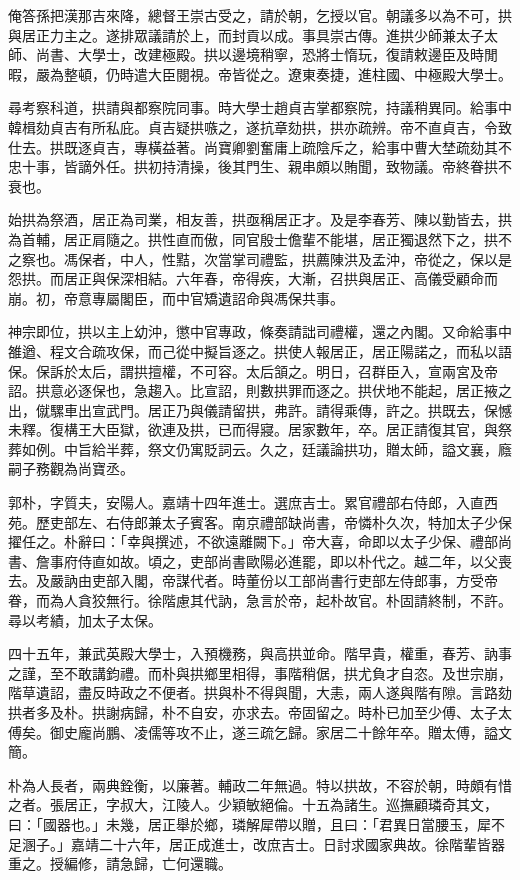 \begin{pinyinscope}
俺答孫把漢那吉來降，總督王崇古受之，請於朝，乞授以官。朝議多以為不可，拱與居正力主之。遂排眾議請於上，而封貢以成。事具崇古傳。進拱少師兼太子太師、尚書、大學士，改建極殿。拱以邊境稍寧，恐將士惰玩，復請敕邊臣及時閒暇，嚴為整頓，仍時遣大臣閱視。帝皆從之。遼東奏捷，進柱國、中極殿大學士。

尋考察科道，拱請與都察院同事。時大學士趙貞吉掌都察院，持議稍異同。給事中韓楫劾貞吉有所私庇。貞吉疑拱嗾之，遂抗章劾拱，拱亦疏辨。帝不直貞吉，令致仕去。拱既逐貞吉，專橫益著。尚寶卿劉奮庸上疏陰斥之，給事中曹大埜疏劾其不忠十事，皆謫外任。拱初持清操，後其門生、親串頗以賄聞，致物議。帝終眷拱不衰也。

始拱為祭酒，居正為司業，相友善，拱亟稱居正才。及是李春芳、陳以勤皆去，拱為首輔，居正肩隨之。拱性直而傲，同官殷士儋輩不能堪，居正獨退然下之，拱不之察也。馮保者，中人，性黠，次當掌司禮監，拱薦陳洪及孟沖，帝從之，保以是怨拱。而居正與保深相結。六年春，帝得疾，大漸，召拱與居正、高儀受顧命而崩。初，帝意專屬閣臣，而中官矯遺詔命與馮保共事。

神宗即位，拱以主上幼沖，懲中官專政，條奏請詘司禮權，還之內閣。又命給事中雒遒、程文合疏攻保，而己從中擬旨逐之。拱使人報居正，居正陽諾之，而私以語保。保訴於太后，謂拱擅權，不可容。太后頷之。明日，召群臣入，宣兩宮及帝詔。拱意必逐保也，急趨入。比宣詔，則數拱罪而逐之。拱伏地不能起，居正掖之出，僦騾車出宣武門。居正乃與儀請留拱，弗許。請得乘傳，許之。拱既去，保憾未釋。復構王大臣獄，欲連及拱，已而得寢。居家數年，卒。居正請復其官，與祭葬如例。中旨給半葬，祭文仍寓貶詞云。久之，廷議論拱功，贈太師，謚文襄，廕嗣子務觀為尚寶丞。

郭朴，字質夫，安陽人。嘉靖十四年進士。選庶吉士。累官禮部右侍郎，入直西苑。歷吏部左、右侍郎兼太子賓客。南京禮部缺尚書，帝憐朴久次，特加太子少保擢任之。朴辭曰：「幸與撰述，不欲遠離闕下。」帝大喜，命即以太子少保、禮部尚書、詹事府侍直如故。頃之，吏部尚書歐陽必進罷，即以朴代之。越二年，以父喪去。及嚴訥由吏部入閣，帝謀代者。時董份以工部尚書行吏部左侍郎事，方受帝眷，而為人貪狡無行。徐階慮其代訥，急言於帝，起朴故官。朴固請終制，不許。尋以考績，加太子太保。

四十五年，兼武英殿大學士，入預機務，與高拱並命。階早貴，權重，春芳、訥事之謹，至不敢講鈞禮。而朴與拱鄉里相得，事階稍倨，拱尤負才自恣。及世宗崩，階草遺詔，盡反時政之不便者。拱與朴不得與聞，大恚，兩人遂與階有隙。言路劾拱者多及朴。拱謝病歸，朴不自安，亦求去。帝固留之。時朴已加至少傅、太子太傅矣。御史龐尚鵬、凌儒等攻不止，遂三疏乞歸。家居二十餘年卒。贈太傅，謚文簡。

朴為人長者，兩典銓衡，以廉著。輔政二年無過。特以拱故，不容於朝，時頗有惜之者。張居正，字叔大，江陵人。少穎敏絕倫。十五為諸生。巡撫顧璘奇其文，曰：「國器也。」未幾，居正舉於鄉，璘解犀帶以贈，且曰：「君異日當腰玉，犀不足溷子。」嘉靖二十六年，居正成進士，改庶吉士。日討求國家典故。徐階輩皆器重之。授編修，請急歸，亡何還職。


\end{pinyinscope}

